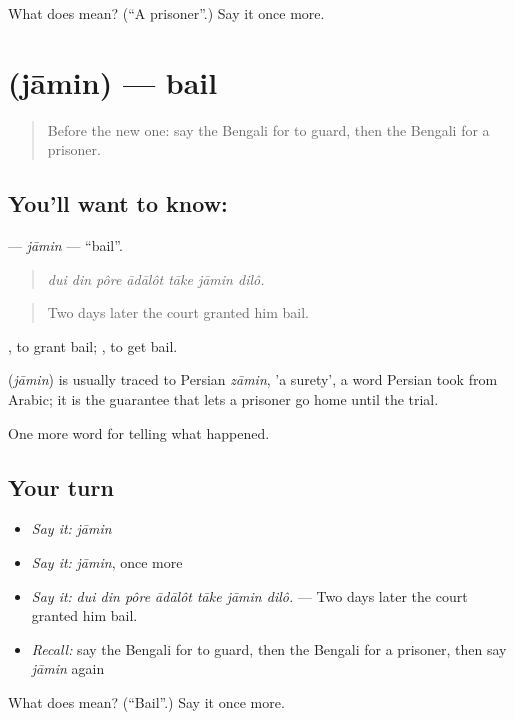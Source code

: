 \begin{tcolorbox}[breakable,colback=teal!4,colframe=teal!35!black,title={Before you move on}]
What does  mean? (\textquotedblleft{}A prisoner\textquotedblright{}.) Say it once more.
\end{tcolorbox}
\section[\texorpdfstring{\bn{জামিন} (jāmin)}{জামিন (jāmin)}]{ (jāmin) — bail}

\label{lesson:BN-C284-jamin}



\begin{quote}
Before the new one: say the Bengali for to guard, then the Bengali for a prisoner.
\end{quote}

\subsection*{You'll want to know: }
\textbf{} — \emph{jāmin} — \textquotedblleft{}bail\textquotedblright{}.

\begin{quote}
      
\end{quote}

\begin{quote}
\emph{dui din pôre ādālôt tāke jāmin dilô.}
\end{quote}

\begin{quote}
Two days later the court granted him bail.
\end{quote}

 , to grant bail;  , to get bail.

\begin{cousinweb}
\textbf{} (\emph{jāmin}) is usually traced to Persian \emph{zāmin}, 'a surety', a word Persian took from Arabic; it is the guarantee that lets a prisoner go home until the trial.
\end{cousinweb}

\begin{grammarlens}[title={What you've built}]
One more word for telling what happened.
\end{grammarlens}

\subsection*{Your turn}
\begin{itemize}
\raggedright
  \item \emph{Say it:} \emph{jāmin}
  \item \emph{Say it:} \emph{jāmin}, once more
  \item \emph{Say it:} \emph{dui din pôre ādālôt tāke jāmin dilô.} — Two days later the court granted him bail.
  \item \emph{Recall:} say the Bengali for to guard, then the Bengali for a prisoner, then say \emph{jāmin} again
\end{itemize}

\begin{tcolorbox}[breakable,colback=teal!4,colframe=teal!35!black,title={Before you move on}]
What does  mean? (\textquotedblleft{}Bail\textquotedblright{}.) Say it once more.
\end{tcolorbox}
